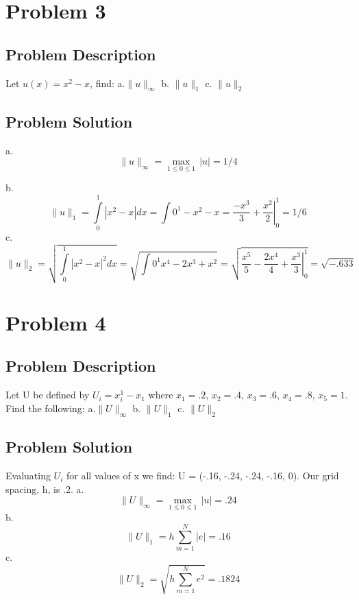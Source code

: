 \documentclass[titlepage]{article}
\begin{document}
\section{Problem 3}
\subsection{Problem Description}
Let $u(x) = x^2-x$, find:
a.$\|u\|_\infty$ b. $\|u\|_1$ c. $\|u\|_2$
\subsection{Problem Solution}
a.\begin{equation*}
\|u\|_\infty = \max_{1\leq 0\leq 1}\,|u| = 1/4
\end{equation*}
\begin{figure}[ht!]
    \centering
\end{figure}
b. \begin{equation*}
\|u\|_1 = \int\limits_0^1 |x^2-x| dx = \int{0}^{1} -x^2 -x = \left.\frac{-x^3}{3} + \frac{x^2}{2}\right|_{0}^1 = 1/6
\end{equation*}
c. \begin{equation*}
\|u\|_2 = \sqrt{\int\limits_0^1 |x^2-x|^2 dx} = \sqrt{\int{0}^{1} x^4-2x^3+x^2} = \sqrt{\left.\frac{x^5}{5} - \frac{2x^4}{4} + \frac{x^3}{3}\right|_{0}^1} = \sqrt{-.633}
\end{equation*}
\section{Problem 4}
\subsection{Problem Description}
Let U be defined by $U_i = x_i^1-x_1$ where $x_1 = .2$, $x_2 = .4$, $x_3 = .6$, $x_4 = .8$, $x_5 = 1$. Find the following:
a.$\|U\|_\infty$ b. $\|U\|_1$ c. $\|U\|_2$
\subsection{Problem Solution}
Evaluating $U_i$ for all values of x we find:
U = (-.16, -.24, -.24, -.16, 0). Our grid spacing, h, is .2.
a.\begin{equation*}
\|U\|_\infty = \max_{1\leq 0\leq 1}\,|u| = .24
\end{equation*}
b. \begin{equation*}
\|U\|_1 = h\sum_{m=1}^N |e| = .16
\end{equation*}
c. \begin{equation*}
\|U\|_2 = \sqrt{h\sum_{m=1}^N e^2} = .1824
\end{equation*}
\end{document}
